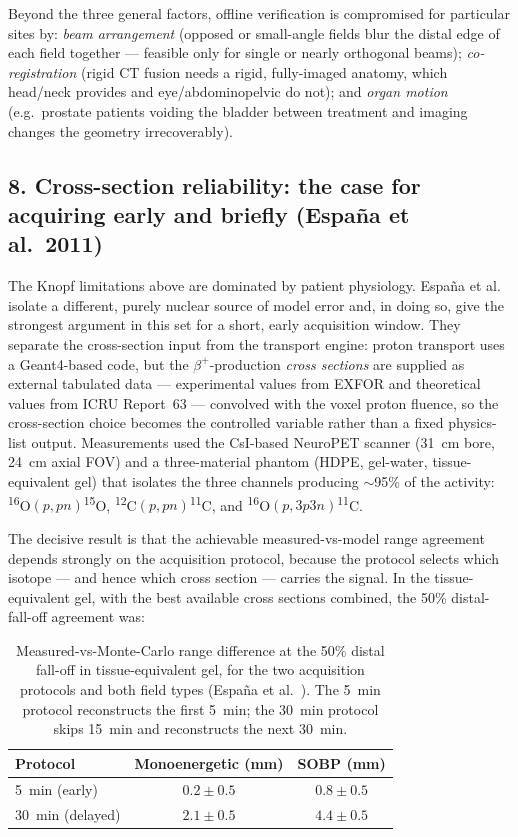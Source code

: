 \documentclass[11pt]{article}
\newcommand{\iso}[2]{\textsuperscript{#1}#2}
\begin{document}
Beyond the three general factors, offline verification is compromised for
particular sites by: \emph{beam arrangement} (opposed or small-angle fields blur
the distal edge of each field together --- feasible only for single or nearly
orthogonal beams); \emph{co-registration} (rigid CT fusion needs a rigid,
fully-imaged anatomy, which head/neck provides and eye/abdominopelvic do not);
and \emph{organ motion} (e.g.\ prostate patients voiding the bladder between
treatment and imaging changes the geometry irrecoverably).

\subsection*{8. Cross-section reliability: the case for acquiring early and
briefly (Espa\~na et al.\ 2011)}

The Knopf limitations above are dominated by patient physiology. Espa\~na et
al.~\cite{espana2011} isolate a different, purely nuclear source of
model error and, in doing so, give the strongest argument in this set for a
short, early acquisition window. They separate the cross-section input from the
transport engine: proton transport uses a Geant4-based code, but the
$\beta^+$-production \emph{cross sections} are supplied as external tabulated
data --- experimental values from EXFOR and theoretical values from ICRU
Report~63 --- convolved with the voxel proton fluence, so the cross-section
choice becomes the controlled variable rather than a fixed physics-list output.
Measurements used the CsI-based NeuroPET scanner (31~cm bore, 24~cm axial FOV)
and a three-material phantom (HDPE, gel-water, tissue-equivalent gel) that
isolates the three channels producing $\sim$95\% of the activity:
\iso{16}{O}$(p,pn)$\iso{15}{O}, \iso{12}{C}$(p,pn)$\iso{11}{C}, and
\iso{16}{O}$(p,3p3n)$\iso{11}{C}.

The decisive result is that the achievable measured-vs-model range agreement
depends strongly on the acquisition protocol, because the protocol selects which
isotope --- and hence which cross section --- carries the signal. In the
tissue-equivalent gel, with the best available cross sections combined, the
50\% distal-fall-off agreement was:

\begin{table}[h]
  \centering
  \caption{Measured-vs-Monte-Carlo range difference at the 50\% distal
    fall-off in tissue-equivalent gel, for the two acquisition protocols and
    both field types (Espa\~na et al.~\cite{espana2011}). The 5~min protocol
    reconstructs the first 5~min; the 30~min protocol skips 15~min and
    reconstructs the next 30~min.}
  \label{tab:espana}
  \begin{tabular}{lcc}
    \toprule
    Protocol & Monoenergetic (mm) & SOBP (mm) \\
    \midrule
    5~min (early)   & $0.2 \pm 0.5$ & $0.8 \pm 0.5$ \\
    30~min (delayed) & $2.1 \pm 0.5$ & $4.4 \pm 0.5$ \\
    \bottomrule
  \end{tabular}
\end{table}
\end{document}
